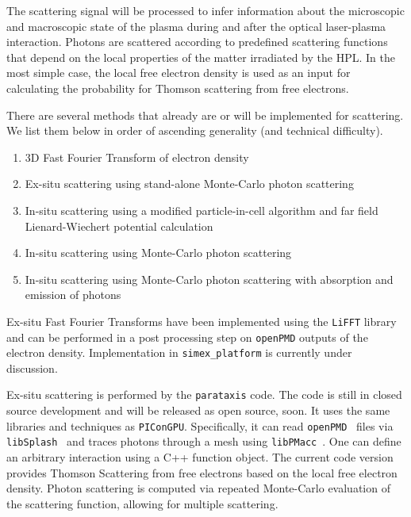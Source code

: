 \documentclass[12pt]{scrartcl}
\begin{document}
The scattering signal will be processed to
infer information about the microscopic and macroscopic state of the plasma
during and after the optical laser-plasma interaction.  Photons are scattered
according to predefined scattering functions that depend on the local properties
of the matter irradiated by the HPL. In the most simple case, the local free
electron density is used as an input for calculating the probability for Thomson
scattering from free electrons.

There are several methods that already are or will be implemented for
scattering. We list them below in order of ascending generality (and technical
difficulty).

\begin{enumerate}
  \item 3D Fast Fourier Transform of electron density
    \label{pmi:methods:fft}
  \item Ex-situ scattering using stand-alone
    Monte-Carlo photon scattering \label{pmi:methods:exsituphoton}
  \item In-situ scattering using a modified particle-in-cell algorithm and far field
      Lienard-Wiechert potential calculation \label{pmi:methods:insitulienardwiechert}
    \item In-situ scattering using Monte-Carlo photon
    scattering\label{pmi:methods:insituphoton}
  \item In-situ scattering using Monte-Carlo photon scattering with absorption
    and emission of photons\label{pmi:methods:insituphotoninteract}
\end{enumerate}

Ex-situ Fast Fourier Transforms have been implemented using the \texttt{LiFFT}
library \cite{liblifft_github} and can be performed in a post processing step on
\texttt{openPMD} outputs of the electron density. Implementation in
\texttt{simex\_platform} is currently under discussion.

Ex-situ scattering is performed by the \texttt{parataxis} code.
The code is still in closed source development and will be released as open source, soon.
It uses the same libraries and
techniques as \texttt{PIConGPU}. Specifically, it can read
\texttt{openPMD}~\cite{openPMD} files via
\texttt{libSplash}~\cite{libSplash_github} and traces photons through a mesh
using \texttt{libPMacc}~\cite{picongpu_github}. One can define an arbitrary
interaction using a C++ function object. The current code version provides
Thomson Scattering from free electrons based on the local free electron density.
Photon scattering is computed via repeated Monte-Carlo evaluation of the
scattering function, allowing for multiple scattering.
\end{document}
